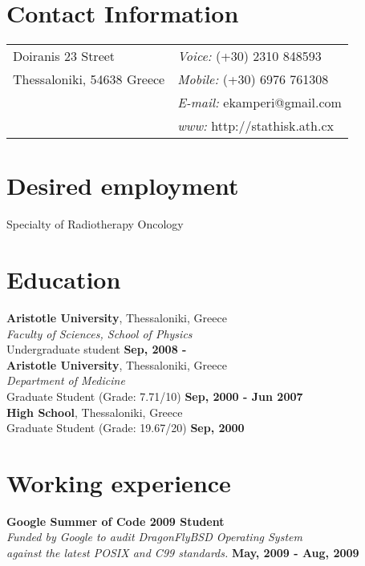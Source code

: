 \documentclass[margin,line]{res}
\begin{document}

\begin{resume}
\section{\sc Contact Information}
\vspace{.05in}
\begin{tabular}{@{}p{2in}p{4in}}
Doiranis 23 Street           & {\it Voice:}   (+30) 2310 848593 \\
Thessaloniki, 54638 Greece   & {\it Mobile:}  (+30) 6976 761308 \\
                             & {\it E-mail:}  ekamperi@gmail.com\\
                             & {\it www:} http://stathisk.ath.cx\\
\end{tabular}

\section{\sc Desired employment}
Specialty of Radiotherapy Oncology

\section{\sc Education}
{\bf Aristotle University}, Thessaloniki, Greece\\
{\em Faculty of Sciences, School of Physics}\\
Undergraduate student \hfill {\bf Sep, 2008 - }\\

{\bf Aristotle University}, Thessaloniki, Greece\\
{\em Department of Medicine}\\
Graduate Student (Grade: 7.71/10) \hfill {\bf Sep, 2000 - Jun 2007}\\

{\bf High School}, Thessaloniki, Greece\\
Graduate Student (Grade: 19.67/20) \hfill {\bf Sep, 2000}\\

\section{\sc Working experience}
{\bf Google Summer of Code 2009 Student}\\
{\em Funded by Google to audit DragonFlyBSD Operating System\\ against the latest POSIX and C99 standards.}
\hfill {\bf May, 2009 - Aug, 2009}\\


\end{resume}
\end{document}
